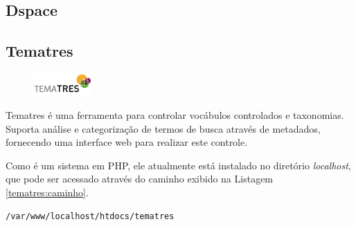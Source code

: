 \subsection{Dspace}\label{dspace}

 \blindtext

 \blindtext

 \blindtext

\subsection{Tematres}\label{tematres}

\begin{figure} %
    \centering
    \includegraphics[width=0.2\textwidth]{../images/tematres.jpg}
\end{figure}

Tematres é uma ferramenta para controlar vocábulos controlados e taxonomias. Suporta análise e categorização de termos de busca através de metadados, fornecendo uma interface web para realizar este controle.

Como é um sistema em PHP, ele atualmente está instalado no diretório \textit{localhost}, que pode ser acessado através do caminho exibido na Listagem \ref{tematres:caminho}.
\begin{lstlisting}[language=bash, label=lst:mariadb.add, caption=Instalação do Tematres.]
    /var/www/localhost/htdocs/tematres
\end{lstlisting}

